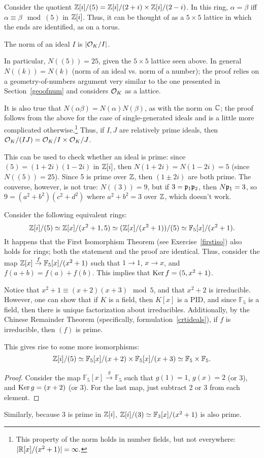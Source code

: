 Consider the quotient $\mathbb{Z}[i]/(5) = \mathbb{Z}[i]/(2+i) \times \mathbb{Z}[i]/(2-i)$. In this ring, $\alpha = \beta$ iff $\alpha \equiv \beta \mod (5)$ in $\mathbb{Z}[i]$. Thus, it can be thought of as a $5\times 5$ lattice in which the ends are identified, as on a torus.
\begin{defn}
The norm of an ideal $I$ is $|\mathcal{O}_K/I|$.
\end{defn}
In particular, $N((5)) = 25$, given the $5\times 5$ lattice seen above. In general $N((k)) = N(k)$ (norm of an ideal vs. norm of a number); the proof relies on a geometry-of-numbers argument very similar to the one presented in Section~\ref{geoofnum} and considers $\mathcal{O}_K$ as a lattice.

It is also true that $N(\alpha\beta) = N(\alpha)N(\beta)$, as with the norm on $\mathbb{C}$; the proof follows from the above for the case of single-generated ideals and is a little more complicated otherwise.\footnote{This property of the norm holds in number fields, but not everywhere: $|\mathbb{R}[x]/(x^2+1)| =\infty.$} Thus, if $I,J$ are relatively prime ideals, then $\mathcal{O}_K/(IJ) = \mathcal{O}_K / I \times \mathcal{O}_K/J$.

This can be used to check whether an ideal is prime: since $(5) = (1+2i)(1-2i)$ in $\mathbb{Z}[i]$, then $N(1+2i) = N(1-2i) = 5$ (since $N((5)) = 25$). Since 5 is prime over $\mathbb{Z}$, then $(1\pm 2i)$ are both prime. The converse, however, is not true: $N((3)) = 9$, but if $3 = \mathfrak p_1\mathfrak p_2$, then $N\mathfrak p_1 = 3$, so $9 = (a^2+b^2)(c^2+d^2)$ where $a^2+b^2 = 3$ over $\mathbb{Z}$, which doesn't work.

Consider the following equivalent rings:
\[\mathbb{Z}[i]/(5) \simeq \mathbb{Z}[x]/(x^2+1,5) \simeq(\mathbb{Z}[x]/(x^2+1))/(5)\simeq \mathbb F_5[x]/(x^2+1).\]
It happens that the First Isomorphism Theorem (see Exercise~\ref{firstiso}) also holds for rings; both the statement and the proof are identical. Thus, consider the map $\mathbb{Z}[x] \stackrel{f}{\to} \mathbb F_5[x]/(x^2+1)$ such that $1\to 1$, $x\to x$, and $f(a+b) = f(a)+f(b)$. This implies that $\operatorname{Ker} f = (5,x^2+1)$.

Notice that $x^2+1 \equiv (x+2)(x+3)\mod 5$, and that $x^2+2$ is irreducible. However, one can show that if $K$ is a field, then $K[x]$ is a PID, and since $\mathbb F_5$ is a field, then there is unique factorization about irreducibles. Additionally, by the Chinese Remainder Theorem (specifically, formulation~\ref{crtideals}), if $f$ is irreducible, then $(f)$ is prime.
\begin{claim}
This gives rise to some more isomorphisms:
\[\mathbb{Z}[i]/(5)\simeq \mathbb F_5[x]/(x+2)\times \mathbb F_5[x]/(x+3) \simeq \mathbb F_5\times \mathbb F_5.\]
\end{claim}
\begin{proof}
Consider the map $\mathbb F_5[x] \stackrel{g}{\to} \mathbb F_5$ such that $g(1) = 1$, $g(x) = 2$ (or 3), and $\operatorname{Ker} g = (x+2)$ (or 3). For the last map, just subtract 2 or 3 from each element.
\end{proof}
Similarly, because 3 is prime in $\mathbb{Z}[i]$, $\mathbb{Z}[i]/(3) \simeq \mathbb F_3[x]/(x^2+1)$ is also prime.

